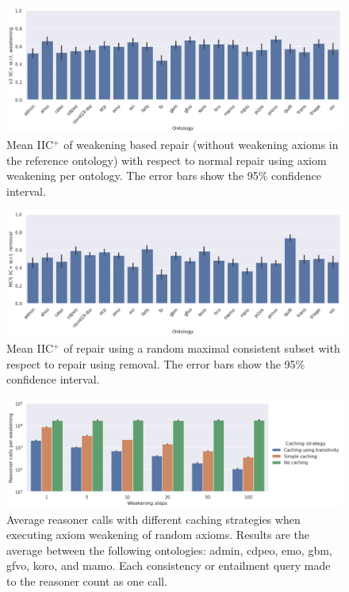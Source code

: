 \begin{figure}[htbp]
  \centering
  \includegraphics[width=\textwidth]{resources/eiic-enhance-weaken-ontology-bar.png}
  \caption{Mean IIC$^+$ of weakening based repair (without weakening axioms in the reference ontology) with respect to normal repair using axiom weakening per ontology. The error bars show the 95\% confidence interval.}
\end{figure}

\begin{figure}[htbp]
  \centering
  \includegraphics[width=\textwidth]{resources/eiic-mcs-rem-ontology-bar.png}
  \caption{Mean IIC$^+$ of repair using a random maximal consistent subset with respect to repair using removal. The error bars show the 95\% confidence interval.}
\end{figure}

\begin{figure}[htbp]
  \centering
  \includegraphics[width=\textwidth]{resources/calls-cache-bar.png}
  \caption{Average reasoner calls with different caching strategies when executing axiom weakening of random axioms. Results are the average between the following ontologies: admin, cdpeo, emo, gbm, gfvo, koro, and mamo. Each consistency or entailment query made to the reasoner count as one call.}
\end{figure}

